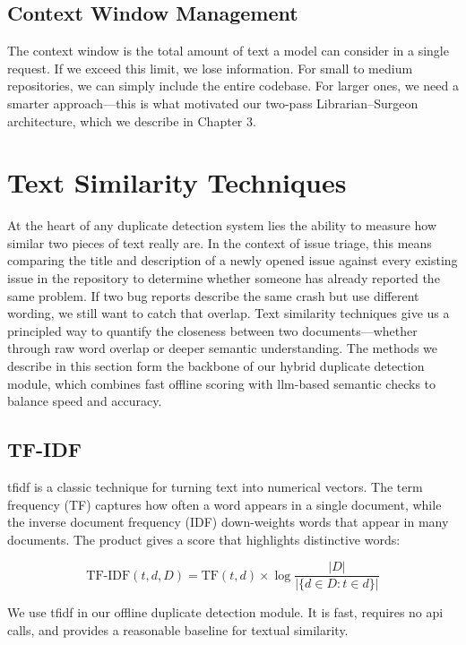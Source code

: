 \subsection{Context Window Management}
The context window is the total amount of text a model can consider in a single request. If we exceed this limit, we lose information. For small to medium repositories, we can simply include the entire codebase. For larger ones, we need a smarter approach---this is what motivated our two-pass Librarian--Surgeon architecture, which we describe in Chapter 3.

\section{Text Similarity Techniques}

At the heart of any duplicate detection system lies the ability to measure how similar two pieces of text really are. In the context of issue triage, this means comparing the title and description of a newly opened issue against every existing issue in the repository to determine whether someone has already reported the same problem. If two bug reports describe the same crash but use different wording, we still want to catch that overlap. Text similarity techniques give us a principled way to quantify the closeness between two documents---whether through raw word overlap or deeper semantic understanding. The methods we describe in this section form the backbone of our hybrid duplicate detection module, which combines fast offline scoring with \gls{llm}-based semantic checks to balance speed and accuracy.

\subsection{TF-IDF}
\gls{tfidf} is a classic technique for turning text into numerical vectors. The term frequency (TF) captures how often a word appears in a single document, while the inverse document frequency (IDF) down-weights words that appear in many documents. The product gives a score that highlights distinctive words:

\begin{equation}
\label{eqn:tfidf}
\text{TF-IDF}(t, d, D) = \text{TF}(t, d) \times \log\frac{|D|}{|\{d \in D : t \in d\}|}
\end{equation}

We use \gls{tfidf} in our offline duplicate detection module. It is fast, requires no \gls{api} calls, and provides a reasonable baseline for textual similarity.

